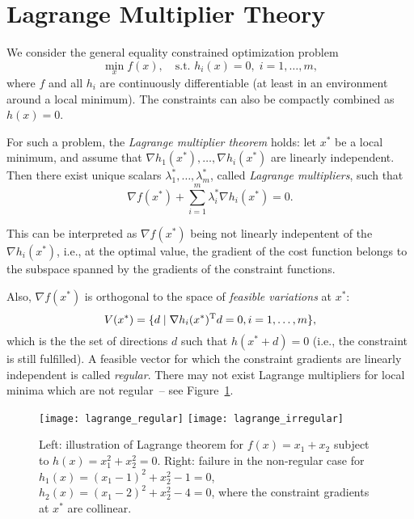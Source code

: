 \documentclass{article}
\begin{document}
\section{Lagrange Multiplier Theory}

\label{s:lagrange-equality}

We consider the general equality constrained optimization problem
\begin{equation*}
  \min_x f(x), \quad\text{s.t. } h_i(x) = 0, \; i = 1, \dots, m,
\end{equation*}
where \(f\) and all \(h_i\) are continuously differentiable (at least in an environment around a
local minimum).  The constraints can also be compactly combined as \(h(x) = 0\).

For such a problem, the \emph{Lagrange multiplier theorem} holds: let \(x^*\) be a local minimum,
and assume that \(\nabla h_1(x^*), \dots, \nabla h_i(x^*)\) are linearly independent.  Then there
exist unique scalars \(\lambda^*_1, \dots, \lambda^*_m\), called \emph{Lagrange multipliers}, such
that
\begin{equation*}
  \nabla f(x^*) + \sum_{i=1}^m \lambda^*_i \nabla h_i(x^*) = 0.
\end{equation*}

This can be interpreted as \(\nabla f(x^*)\) being not linearly indepentent of the
\(\nabla h_i(x^*)\), i.e., at the optimal value, the gradient of the cost function belongs to the
subspace spanned by the gradients of the constraint functions.

Also, \(\nabla f(x^*)\) is orthogonal to the space of \emph{feasible variations} at \(x^*\):
\begin{equation*}
  V(x^*) = \{d \mid \nabla h_i(x^*)^{\mathrm{T}} d = 0, i = 1, \dots, m\},
\end{equation*}
which is the the set of directions \(d\) such that \(h(x^* + d) = 0\) (i.e., the constraint is still
fulfilled).  A feasible vector for which the constraint gradients are linearly independent is called
\emph{regular}.  There may not exist Lagrange multipliers for local minima which are not regular~--
see Figure~\ref{fig:lagrange}.

\begin{figure}[H]
  \centering
  \texttt{[image: lagrange\_regular]}
  \hspace{1em}
  \texttt{[image: lagrange\_irregular]}
  \caption{Left: illustration of Lagrange theorem for \(f(x) = x_1 + x_2\) subject to
    \(h(x) = x_1^2 + x_2^2 = 0\).  Right: failure in the non-regular case for
    \(h_1(x) = (x_1 - 1)^2 + x_2^2 - 1 = 0\), \(h_2(x) = (x_1 - 2)^2 + x_2^2 - 4 = 0\), where the
    constraint gradients at \(x^*\) are collinear.\label{fig:lagrange}}
\end{figure}
\end{document}
